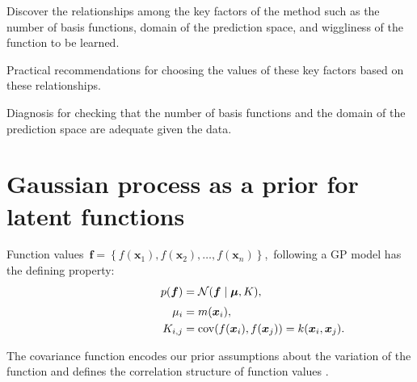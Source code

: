 \documentclass[landscape,a1,final]{a0poster} %
\let\tempone\itemize
\let\temptwo\enditemize
\renewenvironment{itemize}{\tempone\addtolength{\itemsep}{-0.3\baselineskip}}{\temptwo}
\DeclareMathOperator{\cov}{cov}
\begin{document}
\begin{minipage}{1\linewidth}
\begin{minipage}[t]{0.30\linewidth}
\vspace{-7mm}
\centering  %
\hspace{-2mm}
\begin{tcolorbox}[colframe=blue!20, colback=white, title={\small \color{black!80} Our contribution:} Performance analysis for practical implementation of this HSGP, colbacktitle=lightblue, coltitle=black, boxrule=0.5pt, width=1\textwidth]
	\begin{itemize}\setlength\itemsep{2mm}
	\item {\color{navyblue} Discover the relationships} among the key factors of the method such as the number of basis functions, domain of the prediction space, and wiggliness of the function to be learned.
	\item {\color{navyblue} Practical recommendations} for choosing the values of these key factors based on these relationships. %
	\item {\color{navyblue} Diagnosis} for checking that the number of basis functions and the domain of the prediction space are adequate given the data.
	\end{itemize}
\end{tcolorbox}



\vspace{-0.7cm}
\section{Gaussian process as a prior for latent functions}

\begin{itemize}\setlength\itemsep{3mm}
\item Function values\, $\bm{f}=\left\lbrace  f(\bm{x}_1), f(\bm{x}_2), \hdots, f(\bm{x}_n) \right\rbrace$,\, following a GP model has the defining property:
\begin{align*}
p(\bm{f}) &= \mathcal{N}(\bm{f} \mid \bm{\mu}, K),\\[1mm]
\mu_i &= m(\bm{x}_i),\\
\hspace{27mm} K_{i,j} &=\cov( f(\bm{x}_i),f(\bm{x}_j))=k(\bm{x}_i,\bm{x}_j).
\end{align*}


\item The covariance function encodes our prior assumptions about the variation of the function and defines the {\color{navyblue} correlation structure} of function values \citep{rasmussen2006gaussian}.


\end{itemize}
\end{minipage}
\end{minipage}
\end{document}
